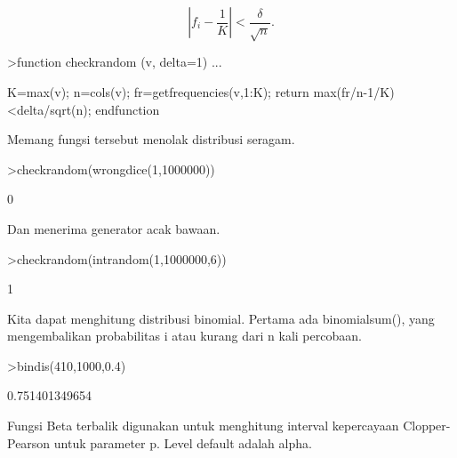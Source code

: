 \documentclass[a4paper,10pt]{article}
\begin{document}
\begin{eulernotebook}
\begin{eulercomment}
\end{eulercomment}
\begin{eulerformula}
\[
\left|f_i-\frac{1}{K}\right| < \frac{\delta}{\sqrt{n}}.
\]
\end{eulerformula}
\begin{eulerprompt}
>function checkrandom (v, delta=1) ...
\end{eulerprompt}
\begin{eulerudf}
    K=max(v); n=cols(v);
    fr=getfrequencies(v,1:K);
    return max(fr/n-1/K)<delta/sqrt(n);
    endfunction
\end{eulerudf}
\begin{eulercomment}
Memang fungsi tersebut menolak distribusi seragam.
\end{eulercomment}
\begin{eulerprompt}
>checkrandom(wrongdice(1,1000000))
\end{eulerprompt}
\begin{euleroutput}
  0
\end{euleroutput}
\begin{eulercomment}
Dan menerima generator acak bawaan.
\end{eulercomment}
\begin{eulerprompt}
>checkrandom(intrandom(1,1000000,6))
\end{eulerprompt}
\begin{euleroutput}
  1
\end{euleroutput}
\begin{eulercomment}
Kita dapat menghitung distribusi binomial. Pertama ada binomialsum(),
yang mengembalikan probabilitas i atau kurang dari n kali percobaan.
\end{eulercomment}
\begin{eulerprompt}
>bindis(410,1000,0.4)
\end{eulerprompt}
\begin{euleroutput}
  0.751401349654
\end{euleroutput}
\begin{eulercomment}
Fungsi Beta terbalik digunakan untuk menghitung interval kepercayaan
Clopper-Pearson untuk parameter p. Level default adalah alpha.


\end{eulercomment}
\end{eulernotebook}
\end{document}
